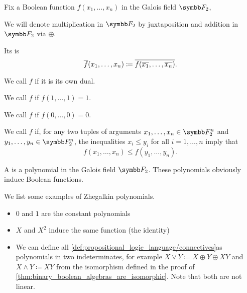 \begin{definition}\label{def:boolean_functions_in_f2}
  Fix a Boolean function \( f(x_1, \ldots, x_n) \) in the Galois field \( \Fld_2 \),

  We will denote multiplication in \( \Fld_2 \) by juxtaposition and addition in \( \Fld_2 \) via \( \oplus \).

  \begin{defenum}
     Its  is
    \begin{equation*}
       \overline{f}(x_1, \ldots, x_n) \coloneqq \overline{f(\overline{x_1}, \ldots, \overline{x_n})}.
    \end{equation*}

     We call \( f \)  if it is its own dual.

     We call \( f \) if \( f(1, \ldots, 1) = 1 \).

     We call \( f \) if \( f(0, \ldots, 0) = 0 \).

     We call \( f \)  if, for any two tuples of arguments \( x_1, \ldots, x_n \in \Fld_2^n \) and \( y_1, \ldots, y_n \in \Fld_2^n \), the inequalities \( x_i \leq y_i \) for all \( i = 1, \ldots, n \) imply that
    \begin{equation*}
      f(x_1, \ldots, x_n) \leq f(y_1, \ldots, y_n).
    \end{equation*}
  \end{defenum}
\end{definition}

\begin{definition}\label{def:zhegalkin_polynomial}
  A  is a polynomial in the Galois field \( \Fld_2 \). These polynomials obviously induce Boolean functions.
\end{definition}

\begin{example}\label{ex:zhegalkin_polynomials}
  We list some examples of Zhegalkin polynomials.

  \begin{itemize}
    \item \( 0 \) and \( 1 \) are the constant polynomials
    \item \( X \) and \( X^2 \) induce the same function (the identity)
    \item We can define all \ref{def:propositional_logic_language/connectives}as polynomials in two indeterminates, for example \( X \lor Y \coloneqq X \oplus Y \oplus XY \) and \( X \land Y \coloneqq XY \) from the isomorphism defined in the proof of \cref{thm:binary_boolean_algebras_are_isomorphic}. Note that both are not linear.
  \end{itemize}
\end{example}

